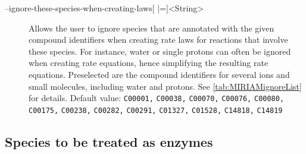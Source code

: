 \begin{description}
\item[--ignore-these-species-when-creating-laws{[} |={]}<String>]
  Allows the user to ignore species that are annotated with the
  given compound identifiers when creating rate laws for reactions
  that involve these species. For instance, water or single protons
  can often be ignored when creating rate equations, hence simplifying
  the resulting rate equations. Preselected are the \KEGG compound
  identifiers for several ions and small molecules, including water and
  protons. See \vref{tab:MIRIAMignoreList} for details.
  Default value: \texttt{C00001,} \texttt{C00038,} \texttt{C00070,}
  \texttt{C00076,} \texttt{C00080,} \texttt{C00175,} \texttt{C00238,}
  \texttt{C00282,} \texttt{C00291,} \texttt{C01327,} \texttt{C01528,}
  \texttt{C14818,} \texttt{C14819}
\end{description}

\subsection{Species to be treated as enzymes}

